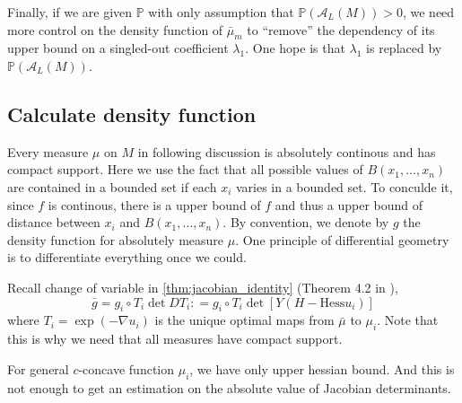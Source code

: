 
Finally, if we are given $\mathbb{P}$ with only assumption that $\mathbb{P}(\mathcal{A}_L(M)) > 0$,
we need more control on the density function of $\bar{\mu}_m$
to ``remove'' the dependency of its upper bound on a singled-out coefficient $\lambda_1$.
One hope is that $\lambda_1$ is replaced by $\mathbb{P}(\mathcal{A}_L(M))$.


\subsection{Calculate density function}

Every measure $\mu$ on $M$ in following discussion is absolutely continous and has compact support.
Here we use the fact that all possible values of $B(x_1, \ldots, x_n)$ are contained in a bounded set if each $x_i$ varies in a bounded set.
To conculde it, since $f$ is continous, there is a upper bound of $f$ and thus a upper bound of distance between $x_i$ and $B(x_1, \ldots, x_n)$.
By convention, we denote by $g$ the density function for absolutely measure $\mu$.
One principle of differential geometry is to differentiate everything once we could.

Recall change of variable in \cref{thm:jacobian_identity} (Theorem 4.2 in \cite{cordero2001riemannian}),
\[
	\bar{g} = g_i \circ T_i \det D T_i :
	= g_i \circ T_i \det[Y(H-\text{Hess} u_i)]
\]
where $T_i = \exp(-\nabla u_i)$ is the unique optimal maps from $\bar{\mu}$ to $\mu_i$.
Note that this is why we need that all measures have compact support.

For general $c$-concave function $\mu_i$, we have only upper hessian bound.
And this is not enough to get an estimation on the absolute value of Jacobian determinants.


